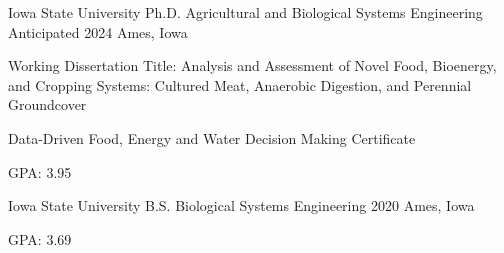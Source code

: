 

\begin{cventries}

  \cventry
    {Iowa State University} %
    {Ph.D. Agricultural and Biological Systems Engineering} %
    {Anticipated 2024} %
    {Ames, Iowa} %
    {
      \begin{cvitems} %
      \setlength\itemsep{.4em}
      \item {Working Dissertation Title: Analysis and Assessment of Novel Food, Bioenergy, and Cropping Systems: Cultured Meat, Anaerobic Digestion, and Perennial Groundcover}
      \item {Data-Driven Food, Energy and Water Decision Making Certificate}
        \item {GPA: 3.95}
      \end{cvitems}
    }
\vspace*{.5cm}
\cventry
    {Iowa State University} %
    {B.S. Biological Systems Engineering} %
    {2020} %
    {Ames, Iowa} %
    {
      \begin{cvitems} %
      \setlength\itemsep{.4em}
        \item {GPA: 3.69}
      \end{cvitems}
    }
\end{cventries}

